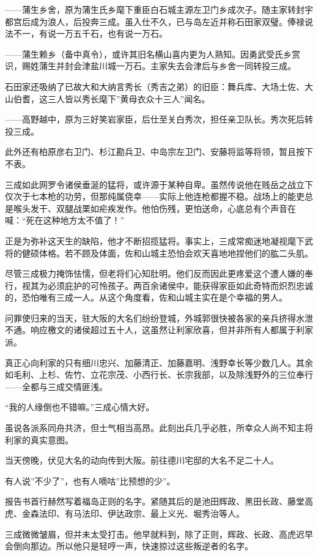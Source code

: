 \documentclass[
]{article}
\begin{document}
------蒲生乡舍，原为蒲生氏乡麾下重臣白石城主源左卫门乡成次子。随主家转封宇都宫后成为浪人，后投奔三成。虽入仕不久，已与岛左近并称石田家双璧。俸禄说法不一，有说一万五千石，也有说一万石。

------蒲生赖乡（备中真令），或许其旧名横山喜内更为人熟知。因勇武受氏乡赏识，赐姓蒲生并封会津盐川城一万石。主家失去会津后与乡舍一同转投三成。

石田家还吸纳了已故大和大纳言秀长（秀吉之弟）的旧臣：舞兵库、大场土佐、大山伯耆，这三人皆以秀长麾下''黄母衣众十三人''闻名。

------高野越中，原为三好笑岩家臣，后仕至关白秀次，担任亲卫队长。秀次死后转投三成。

此外还有柏原彦右卫门、杉江勘兵卫、中岛宗左卫门、安藤将监等将领，暂且按下不表。

三成如此网罗令诸侯垂涎的猛将，或许源于某种自卑。虽然传说他在贱岳之战立下仅次于七本枪的功劳，但那纯属侥幸------实际上他连枪都握不稳。战场上的能吏总是喉头发干、双腿战栗如疟疾发作。他怕伤残，更怕送命，心底总有个声音在喊：``死在这种地方太不值了！''

正是为弥补这天生的缺陷，他才不断招揽猛将。事实上，三成常痴迷地凝视麾下武将的健硕体格。若不顾及体面，佐和山城主恐怕会欢天喜地地捏他们的肱二头肌。

尽管三成极力掩饰怯懦，但老将们心知肚明。他们反而因此更疼爱这个遭人嫌的奉行，视其为必须庇护的可怜孩子。两百余诸侯中，能获得家臣如此奇特而炽烈忠诚的，恐怕唯有三成一人。从这个角度看，佐和山城主实在是个幸福的男人。

问罪使归来的当天，驻大阪的大名们纷纷登城，外城郭很快被各家的亲兵挤得水泄不通。响应檄文的诸侯超过五十人，这虽然让利家欣喜，但并非所有人都属于利家派。

真正心向利家的只有细川忠兴、加藤清正、加藤嘉明、浅野幸长等少数几人。其余如毛利、上杉、佐竹、立花宗茂、小西行长、长宗我部，以及除浅野外的三位奉行------全都与三成交情匪浅。

``我的人缘倒也不错嘛。''三成心情大好。

虽说各派系同舟共济，但士气相当高昂。此刻出兵几乎必胜，所幸众人尚不知主将利家的真实意图。

当天傍晚，伏见大名的动向传到大阪。前往德川宅邸的大名不足二十人。

有人说''不少了''，也有人嘀咕''比预想的少''。

报告书首行赫然写着福岛正则的名字。紧随其后的是池田辉政、黑田长政、藤堂高虎、金森法印、有马法印、伊达政宗、最上义光、堀秀治等人。

三成微微皱眉，但并未太受打击。他早就料到，除了正则，辉政、长政、高虎迟早会倒向那边。所以他只是轻哼一声，快速掠过这些叛逆者的名字。
\end{document}
